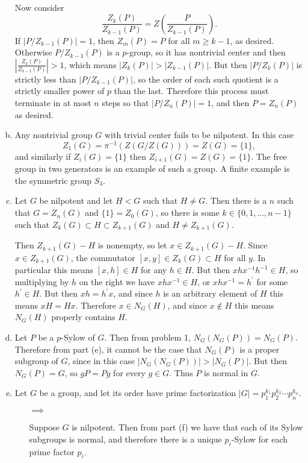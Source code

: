 \documentclass{article}
\begin{document}
\begin{Answer}
\begin{enumerate}[(a)]
{    Now consider
    $$
    \frac{Z_k(P)}{Z_{k-1}(P)} = Z\left(\frac{P}{Z_{k-1}(P)}\right).
    $$
    If $|P / Z_{k-1}(P)| = 1$, then $Z_{m}(P) = P$ for all $m \geq
    k-1$, as desired. Otherwise $P / Z_{k-1}(P)$ is a $p$-group,
    so it has nontrivial center and then
    $\left|\frac{Z_k(P)}{Z_{k-1}(P)}\right| > 1$, which means
    $|Z_k(P)| > |Z_{k-1}(P)|$. But then
    $|P / Z_k(P)|$ is strictly less than $|P / Z_{k-1}(P)|$, so the
    order of each such quotient is a strictly smaller power of
    $p$ than the last. Therefore this process must terminate in at
    most $n$ steps so that $|P / Z_n(P)| = 1$,
    and then $P = Z_n(P)$ as desired.
  }
  \item{
    Any nontrivial group $G$ with trivial center fails to be nilpotent.
    In this case
    $$
    Z_1(G) = \pi^{-1}(Z(G / Z(G))) = Z(G) = \{ 1 \},
    $$
    and similarly if
    $Z_i(G) = \{ 1 \}$ then $Z_{i+1}(G) = Z(G) = \{ 1 \}$. The free group in
    two generators is an example of such a group. A finite example is
    the symmetric group $S_3$.
  }
  \item{
    Let $G$ be nilpotent and let $H < G$ such that $H \neq G$.
    Then there is a $n$ such that $G = Z_n(G)$ and
    $\{ 1 \} = Z_0(G)$, so there is some
    $k \in \{0, 1, \dots, n-1\}$ such that
    $Z_k(G) \subset H \subset Z_{k+1}(G)$ and $H \neq Z_{k+1}(G)$.

    Then $Z_{k+1}(G) - H$ is nonempty, so let $x \in Z_{k+1}(G) - H$.
    Since $x \in Z_{k+1}(G)$, the commutator
    $[x, y] \in Z_{k}(G) \subset H$ for all $y$. In particular this means
    $[x, h] \in H$ for any $h \in H$. But then
    $x h x^{-1} h^{-1} \in H$, so multiplying by $h$ on the right we
    have $x h x^{-1} \in H$, or $x h x^{-1} = h^\prime$ for some
    $h^\prime \in H$. But then $x h = h^\prime x$, and since $h$ is an
    arbitrary element of $H$ this means $x H = H x$. Therefore
    $x \in N_G(H)$, and since $x \notin H$ this means
    $N_G(H)$ properly contains $H$.
  }
  \item{
    Let $P$ be a $p$-Sylow of $G$. Then from problem 1, $N_G(N_G(P)) =
    N_G(P)$. Therefore from part (e), it cannot be the case that
    $N_G(P)$ is a proper subgroup of $G$, since in this case
    $|N_G(N_G(P))| > |N_G(P)|$. But then $N_G(P) = G$, so $gP = Pg$
    for every $g \in G$. Thus $P$ is normal in $G$.
  }
  \item{
    Let $G$ be a group, and let its order have prime factorization
    $|G| = p_1^{k_1} p_2^{k_2} \cdots p_n^{k_n}$.
    \begin{itemize}
      \item[$\implies$]{
        Suppose $G$ is nilpotent. Then from part (f) we have that each
        of its Sylow subgroups is normal, and therefore there is a
        unique $p_i$-Sylow for each prime factor $p_i$.

}
\end{itemize}}
\end{enumerate}
\end{Answer}
\end{document}
